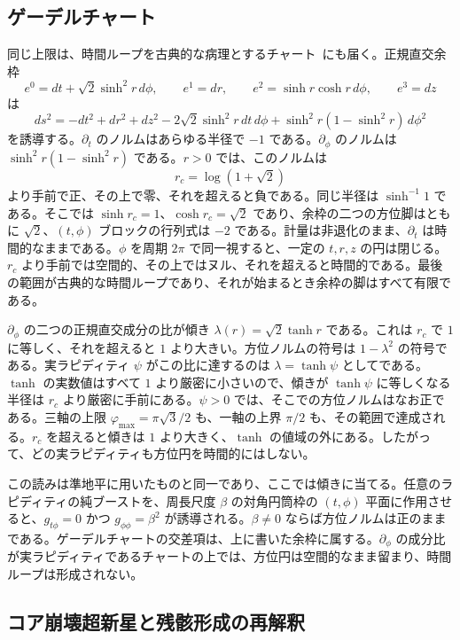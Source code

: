 \documentclass[a4paper]{article}
\begin{document}
\subsection{ゲーデルチャート}
\label{subsec:godel}

同じ上限は、時間ループを古典的な病理とするチャート~\cite{godel1949}にも届く。正規直交余枠
\[
e^0=dt+\sqrt{2}\sinh^2 r\,d\phi,\qquad
e^1=dr,\qquad
e^2=\sinh r\cosh r\,d\phi,\qquad
e^3=dz
\]
は
\[
ds^2=-dt^2+dr^2+dz^2-2\sqrt{2}\sinh^2 r\,dt\,d\phi+\sinh^2 r(1-\sinh^2 r)\,d\phi^2
\]
を誘導する。$\partial_t$ のノルムはあらゆる半径で $-1$ である。$\partial_\phi$ のノルムは $\sinh^2 r(1-\sinh^2 r)$ である。$r>0$ では、このノルムは
\[
r_c=\log(1+\sqrt{2})
\]
より手前で正、その上で零、それを超えると負である。同じ半径は $\sinh^{-1}1$ である。そこでは $\sinh r_c=1$、$\cosh r_c=\sqrt{2}$ であり、余枠の二つの方位脚はともに $\sqrt{2}$、$(t,\phi)$ ブロックの行列式は $-2$ である。計量は非退化のまま、$\partial_t$ は時間的なままである。$\phi$ を周期 $2\pi$ で同一視すると、一定の $t,r,z$ の円は閉じる。$r_c$ より手前では空間的、その上ではヌル、それを超えると時間的である。最後の範囲が古典的な時間ループであり、それが始まるとき余枠の脚はすべて有限である。

$\partial_\phi$ の二つの正規直交成分の比が傾き $\lambda(r)=\sqrt{2}\tanh r$ である。これは $r_c$ で $1$ に等しく、それを超えると $1$ より大きい。方位ノルムの符号は $1-\lambda^2$ の符号である。実ラピディティ $\psi$ がこの比に達するのは $\lambda=\tanh\psi$ としてである。$\tanh$ の実数値はすべて $1$ より厳密に小さいので、傾きが $\tanh\psi$ に等しくなる半径は $r_c$ より厳密に手前にある。$\psi>0$ では、そこでの方位ノルムはなお正である。三軸の上限 $\varphi_{\max}=\pi\sqrt{3}/2$ も、一軸の上界 $\pi/2$ も、その範囲で達成される。$r_c$ を超えると傾きは $1$ より大きく、$\tanh$ の値域の外にある。したがって、どの実ラピディティも方位円を時間的にはしない。

この読みは準地平に用いたものと同一であり、ここでは傾きに当てる。任意のラピディティの純ブーストを、周長尺度 $\beta$ の対角円筒枠の $(t,\phi)$ 平面に作用させると、$g_{t\phi}=0$ かつ $g_{\phi\phi}=\beta^2$ が誘導される。$\beta\neq 0$ ならば方位ノルムは正のままである。ゲーデルチャートの交差項は、上に書いた余枠に属する。$\partial_\phi$ の成分比が実ラピディティであるチャートの上では、方位円は空間的なまま留まり、時間ループは形成されない。

\subsection{コア崩壊超新星と残骸形成の再解釈}
\end{document}
